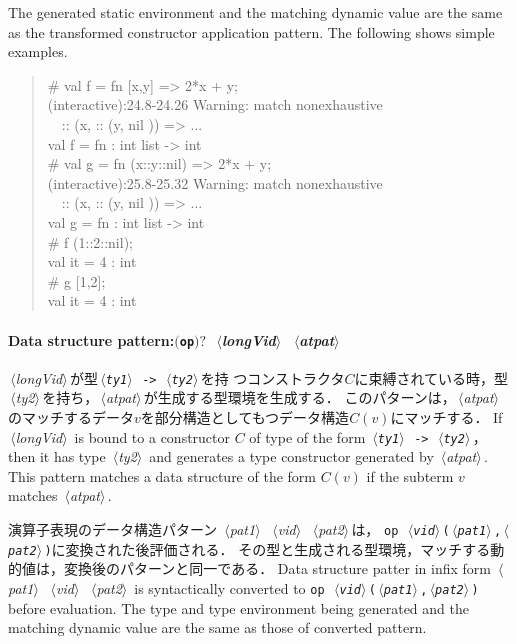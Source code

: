 \documentclass{jbook}
\newcommand{\txt}[2]{#2}
\newcommand{\code}[1]{\mbox{\large\tt #1}}
\newcommand{\nonterm}[1]{\mbox{$\,\langle$}{\it #1}\mbox{$\rangle\,$}}
\newcommand{\term}[1]{\mbox{{\tt #1}}}
\newcommand{\optional}[1]{\mbox{$($}{\protect #1}\mbox{$)?$}}
\newcommand{\myem}{\mbox{\ \ }}
\newenvironment{program}{\begin{quote}\begin{tt}}%
                        {\end{tt}\end{quote}}
\begin{document}
	The generated static environment and the matching dynamic value
are the same as the transformed constructor application pattern.
	The following shows simple examples.
\fi%

\begin{program}
\# val f = fn [x,y] => 2*x + y;\\
(interactive):24.8-24.26 Warning: match nonexhaustive\\
\myem      :: (x, :: (y, nil )) => ...\\
val f = fn : int list -> int\\
\# val g = fn (x::y::nil) => 2*x + y;\\
(interactive):25.8-25.32 Warning: match nonexhaustive\\
\myem      :: (x, :: (y, nil )) => ...\\
val g = fn : int list -> int\\
\# f (1::2::nil);\\
val it = 4 : int\\
\# g [1,2];\\
val it = 4 : int
\end{program}


\paragraph{\txt{データ構造パターン}{Data structure pattern}:\optional{\term{op}}\ \nonterm{longVid}\ \nonterm{atpat}}
\ifjp%
	\nonterm{longVid}が型\code{\nonterm{ty1} -> \nonterm{ty2}}を持
つコンストラクタ$C$に束縛されている時，型\nonterm{ty2}を持ち，\nonterm{atpat}が生成する型環境を生成する．
	このパターンは，\nonterm{atpat}のマッチするデータ$v$を部分構造としてもつデータ構造$C(v)$にマッチする．
\else%
	If \nonterm{longVid} is bound to a constructor $C$ of type of
the form \code{\nonterm{ty1} -> \nonterm{ty2}}，then it has type
\nonterm{ty2} and generates a type constructor generated by \nonterm{atpat}.
	This pattern matches a data structure of the form $C(v)$ if the
subterm $v$ matches \nonterm{atpat}.
\fi%

\ifjp%
	演算子表現のデータ構造パターン \nonterm{pat1}\ \nonterm{vid}\ \nonterm{pat2}は，
\code{op \nonterm{vid}(\nonterm{pat1},\nonterm{pat2})}に変換された後評価される．
	その型と生成される型環境，マッチする動的値は，変換後のパターンと同一である．
\else%
	Data structure patter in infix form \nonterm{pat1}\ \nonterm{vid}\ \nonterm{pat2}
is syntactically converted to \code{op \nonterm{vid}(\nonterm{pat1},\nonterm{pat2})}
before evaluation.
	The type and type environment being generated and the matching
dynamic value are the same as those of converted pattern.
\fi%
\end{document}
